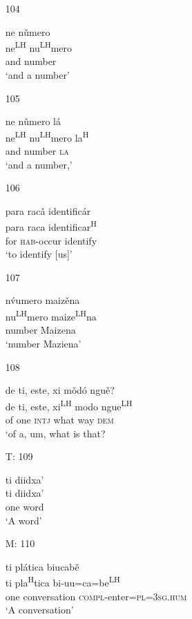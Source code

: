 \begin{itemize}
\item[104]
 
\glll   ne n\v{u}mero\\
ne\textsuperscript{LH} nu\textsuperscript{LH}mero\\
 and number\\
\glt `and a number'
 


\item[105]
 
\glll   ne n\v{u}mero l\'{a}\\
ne\textsuperscript{LH} nu\textsuperscript{LH}mero la\textsuperscript{H}\\
and number \textsc{la}\\
\glt `and a number,' 
 

\item[106]
 
\glll   para rac\v{a} identific\'{a}r\\
para raca identificar\textsuperscript{H}\\
for \textsc{hab}-occur identify\\
\glt `to identify [us]'
 


\item[107]
 
\glll   n\'v{u}mero maiz\v{e}na\\
 nu\textsuperscript{LH}mero maize\textsuperscript{LH}na\\
 number Maizena\\
\glt `number Maziena'
 

\item[108]
 
\glll  de ti, este, xi m\v{o}d\'{o} ngu\v{e}?\\
de ti, este, xi\textsuperscript{LH} modo ngue\textsuperscript{LH}\\
 of one \textsc{intj} what way \textsc{dem}\\
\glt `of a, um, what is that?
 

\item[T: 109]
 
\glll   ti diidxa'\\
 ti diidxa'\\ 
 one word\\
\glt `A word'
 


\item[M: 110]
 
\glll   ti pl\'{a}tica biucab\v{e}\\
ti pla\textsuperscript{H}tica bi-uu=ca=be\textsuperscript{LH}\\
one conversation \textsc{compl}-enter=\textsc{pl}=\textsc{3sg.hum}\\
\glt `A conversation'
 



\end{itemize}
